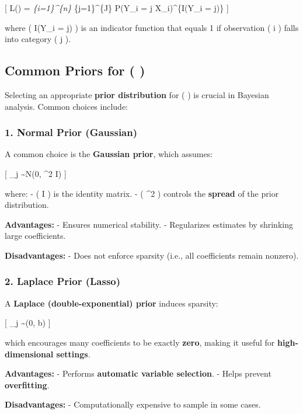 \documentclass[
  letterpaper,
  DIV=11,
  numbers=noendperiod]{scrartcl}
\begin{document}
{[} L(\beta) = \prod\emph{\{i=1\}\^{}\{n\} \prod}\{j=1\}\^{}\{J\} P(Y\_i
= j \textbar{} X\_i)\^{}\{I(Y\_i = j)\} {]}

where ( I(Y\_i = j) ) is an indicator function that equals 1 if
observation ( i ) falls into category ( j ).

\subsection{\texorpdfstring{Common Priors for (
\beta )}{Common Priors for ( )}}\label{common-priors-for}

Selecting an appropriate \textbf{prior distribution} for ( \beta ) is
crucial in Bayesian analysis. Common choices include:

\subsubsection{\texorpdfstring{1. \textbf{Normal Prior
(Gaussian)}}{1. Normal Prior (Gaussian)}}\label{normal-prior-gaussian}

A common choice is the \textbf{Gaussian prior}, which assumes:

{[} \beta\_j \sim N(0, \sigma\^{}2 I) {]}

where: - ( I ) is the identity matrix. - ( \sigma\^{}2 ) controls the
\textbf{spread} of the prior distribution.

\textbf{Advantages:} - Ensures numerical stability. - Regularizes
estimates by shrinking large coefficients.

\textbf{Disadvantages:} - Does not enforce sparsity (i.e., all
coefficients remain nonzero).

\subsubsection{\texorpdfstring{2. \textbf{Laplace Prior
(Lasso)}}{2. Laplace Prior (Lasso)}}\label{laplace-prior-lasso}

A \textbf{Laplace (double-exponential) prior} induces sparsity:

{[} \beta\_j \sim {}(0, b) {]}

which encourages many coefficients to be exactly \textbf{zero}, making
it useful for \textbf{high-dimensional settings}.

\textbf{Advantages:} - Performs \textbf{automatic variable selection}. -
Helps prevent \textbf{overfitting}.

\textbf{Disadvantages:} - Computationally expensive to sample in some
cases.
\end{document}
